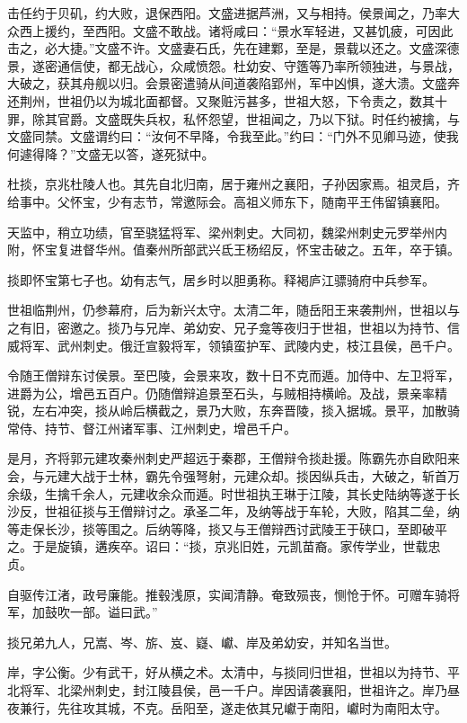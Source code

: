 \documentclass[12pt,UTF8]{ctexbook}
\begin{document}
击任约于贝矶，约大败，退保西阳。文盛进据芦洲，又与相持。侯景闻之，乃率大众西上援约，至西阳。文盛不敢战。诸将咸曰：“景水军轻进，又甚饥疲，可因此击之，必大捷。”文盛不许。文盛妻石氏，先在建鄴，至是，景载以还之。文盛深德景，遂密通信使，都无战心，众咸愤怨。杜幼安、守簉等乃率所领独进，与景战，大破之，获其舟舰以归。会景密遣骑从间道袭陷郢州，军中凶惧，遂大溃。文盛奔还荆州，世祖仍以为城北面都督。又聚赃污甚多，世祖大怒，下令责之，数其十罪，除其官爵。文盛既失兵权，私怀怨望，世祖闻之，乃以下狱。时任约被擒，与文盛同禁。文盛谓约曰：“汝何不早降，令我至此。”约曰：“门外不见卿马迹，使我何遽得降？”文盛无以答，遂死狱中。

杜掞，京兆杜陵人也。其先自北归南，居于雍州之襄阳，子孙因家焉。祖灵启，齐给事中。父怀宝，少有志节，常邀际会。高祖义师东下，随南平王伟留镇襄阳。

天监中，稍立功绩，官至骁猛将军、梁州刺史。大同初，魏梁州刺史元罗举州内附，怀宝复进督华州。值秦州所部武兴氐王杨绍反，怀宝击破之。五年，卒于镇。

掞即怀宝第七子也。幼有志气，居乡时以胆勇称。释褐庐江骠骑府中兵参军。

世祖临荆州，仍参幕府，后为新兴太守。太清二年，随岳阳王来袭荆州，世祖以与之有旧，密邀之。掞乃与兄岸、弟幼安、兄子龛等夜归于世祖，世祖以为持节、信威将军、武州刺史。俄迁宣毅将军，领镇蛮护军、武陵内史，枝江县侯，邑千户。

令随王僧辩东讨侯景。至巴陵，会景来攻，数十日不克而遁。加侍中、左卫将军，进爵为公，增邑五百户。仍随僧辩追景至石头，与贼相持横岭。及战，景亲率精锐，左右冲突，掞从岭后横截之，景乃大败，东奔晋陵，掞入据城。景平，加散骑常侍、持节、督江州诸军事、江州刺史，增邑千户。

是月，齐将郭元建攻秦州刺史严超远于秦郡，王僧辩令掞赴援。陈霸先亦自欧阳来会，与元建大战于士林，霸先令强弩射，元建众却。掞因纵兵击，大破之，斩首万余级，生擒千余人，元建收余众而遁。时世祖执王琳于江陵，其长史陆纳等遂于长沙反，世祖征掞与王僧辩讨之。承圣二年，及纳等战于车轮，大败，陷其二垒，纳等走保长沙，掞等围之。后纳等降，掞又与王僧辩西讨武陵王于硖口，至即破平之。于是旋镇，遘疾卒。诏曰：“掞，京兆旧姓，元凯苗裔。家传学业，世载忠贞。

自驱传江渚，政号廉能。推毂浅原，实闻清静。奄致殒丧，恻怆于怀。可赠车骑将军，加鼓吹一部。谥曰武。”

掞兄弟九人，兄嵩、岑、旂、岌、嶷、巘、岸及弟幼安，并知名当世。

岸，字公衡。少有武干，好从横之术。太清中，与掞同归世祖，世祖以为持节、平北将军、北梁州刺史，封江陵县侯，邑一千户。岸因请袭襄阳，世祖许之。岸乃昼夜兼行，先往攻其城，不克。岳阳至，遂走依其兄巘于南阳，巘时为南阳太守。
\end{document}
